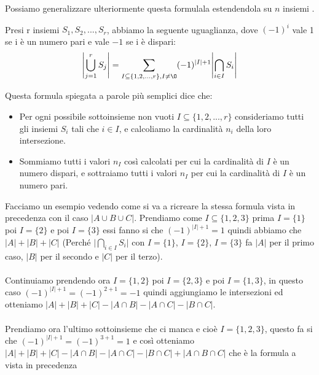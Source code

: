 \hspace{-15pt}Possiamo generalizzare ulteriormente questa formulala estendendola su $n$ insiemi .
\begin{definition}
    Presi r insiemi $S_1, S_2,..., S_r$, abbiamo la seguente uguaglianza, dove $(-1)^i$ vale 1 se i è un numero pari e vale $-1$ se i è dispari:
    \begin{equation}
        \Biggl\lvert \bigcup\limits_{j=1}^r S_j \Biggr\rvert = \sum\limits_{I \subseteq \{1,2,...,r\}, I\neq \O }(-1)^{|I|+1} \Biggl\lvert\bigcap\limits_{i\in I}S_i\Biggr\rvert
    \end{equation}
\end{definition}
\hspace{-15pt}Questa formula spiegata a parole più semplici dice che:
\begin{itemize}
    \item Per ogni possibile sottoinsieme non vuoti $I \subseteq \{1,2,...,r\}$ consideriamo tutti gli insiemi $S_i$ tali che $i \in I$, e calcoliamo la cardinalità $n_i$ della loro intersezione.
    \item Sommiamo tutti i valori $n_I$ così calcolati per cui la cardinalità di $I$ è un numero dispari, e sottraiamo tutti i valori $n_I$ per cui la cardinalità di $I$ è un numero pari.
\end{itemize}
\begin{example}
Facciamo un esempio vedendo come si va a ricreare la stessa formula vista in precedenza con il caso $|A \cup B \cup C|$.
Prendiamo come $I \subseteq \{1,2,3\}$ prima $I = \{1\}$ poi $I = \{2\}$ e poi $I = \{3\}$ essi fanno si che $(-1)^{|I|+1} = 1$ quindi abbiamo che $|A| + |B| + |C|$ (Perché $\Biggl\lvert\bigcap\limits_{i\in I}S_i\Biggr\rvert$ con $I = \{1\}$, $I = \{2\}$, $I = \{3\}$ fa $|A|$ per il primo caso, $|B|$ per il secondo e $|C|$ per il terzo). \\\\
Continuiamo prendendo ora $I = \{1,2\}$ poi $I = \{2,3\}$ e poi $I = \{1,3\}$, in questo caso $(-1)^{|I|+1} = (-1)^{2+1} = -1$ quindi aggiungiamo le intersezioni ed otteniamo $|A| + |B| + |C| - |A \cap B| - |A \cap C| - |B \cap C|$. \\\\
Prendiamo ora l'ultimo sottoinsieme che ci manca e cioè $I = \{1,2,3\}$, questo fa si che $(-1)^{|I|+1} = (-1)^{3+1} = 1$ e così otteniamo $|A| + |B| + |C| - |A \cap B| - |A \cap C| - |B \cap C| + |A \cap B \cap C|$ che è la formula a vista in precedenza
\end{example}

